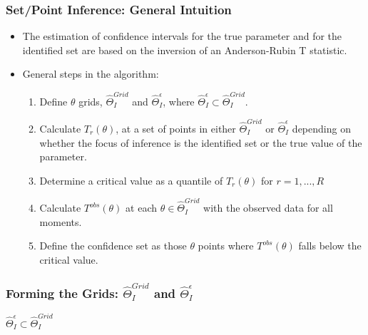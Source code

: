 \begin{frame}
\frametitle{Set/Point Inference: General Intuition}

\begin{itemize}
	\item The estimation of confidence intervals for the true parameter and for the identified set are based on the inversion of an Anderson-Rubin T statistic.
	\item General steps in the algorithm:
	\begin{enumerate}
		\item Define $\theta$ grids, $\widehat{\Theta}_{I}^{Grid}$ and $\widehat{\Theta}_{I}^{\epsilon}$, where $\widehat{\Theta}_{I}^{\epsilon}\subset 
\widehat{\Theta }_{I}^{Grid}$.
		\item Calculate $T_{r}(\theta)$, at a set of points in either $\widehat{\Theta }_{I}^{Grid}$ or $\widehat{\Theta}_{I}^{\epsilon}$ depending on whether the
focus of inference is the identified set or the true value of the parameter.
		\item Determine a critical value as a quantile of $T_{r}(\theta)$ for $r=1,...,R$
		\item Calculate $T^{obs}(\theta)$ at each $\theta\in\widehat{\Theta }_{I}^{Grid}$ with the observed data for all moments.
		\item Define the confidence set as those $\theta$ points where $T^{obs}(\theta)$ falls below the critical value.
	\end{enumerate}
\end{itemize}
\end{frame}
\begin{frame}
\frametitle{Forming the Grids: $\widehat{\Theta}_{I}^{Grid}$ and $\widehat{\Theta}_{I}^{\epsilon}$}

$\widehat{\Theta}_{I}^{\epsilon}\subset \widehat{\Theta}_{I}^{Grid}$

\begin{figure}[h!]
\begin{center}
\end{center}
\end{figure}	
\end{frame}
